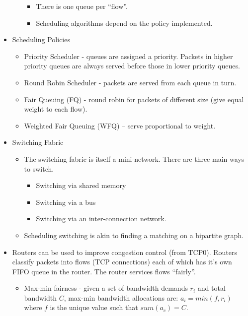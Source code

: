 \documentclass[]{article}
\providecommand{\tightlist}{%
  \setlength{\itemsep}{0pt}\setlength{\parskip}{0pt}}
\begin{document}
\begin{itemize}
\begin{itemize}
    \begin{itemize}
    \tightlist
    \item
      There is one queue per ``flow''.
    \item
      Scheduling algorithms depend on the policy implemented.
    \end{itemize}
  \end{itemize}
\item
  Scheduling Policies

  \begin{itemize}
  \tightlist
  \item
    Priority Scheduler - queues are assigned a priority. Packets in
    higher priority queues are always served before those in lower
    priority queues.
  \item
    Round Robin Scheduler - packets are served from each queue in turn.
  \item
    Fair Queuing (FQ) - round robin for packets of different size (give
    equal weight to each flow).
  \item
    Weighted Fair Queuing (WFQ) -- serve proportional to weight.
  \end{itemize}
\item
  Switching Fabric

  \begin{itemize}
  \tightlist
  \item
    The switching fabric is itself a mini-network. There are three main
    ways to switch.

    \begin{itemize}
    \tightlist
    \item
      Switching via shared memory
    \item
      Switching via a bus
    \item
      Switching via an inter-connection network.
    \end{itemize}
  \item
    Scheduling switching is akin to finding a matching on a bipartite
    graph.
  \end{itemize}
\item
  Routers can be used to improve congestion control (from TCP0). Routers
  classify packets into flows (TCP connections) each of which has it's
  own FIFO queue in the router. The router services flows ``fairly''.

  \begin{itemize}
  \tightlist
  \item
    Max-min fairness - given a set of bandwidth demands \(r_i\) and
    total bandwidth \(C\), max-min bandwidth allocations are:
    \(a_i = min(f, r_i)\) where \(f\) is the unique value such that
    \(sum(a_c) = C\).
  \end{itemize}


\end{itemize}
\end{document}
